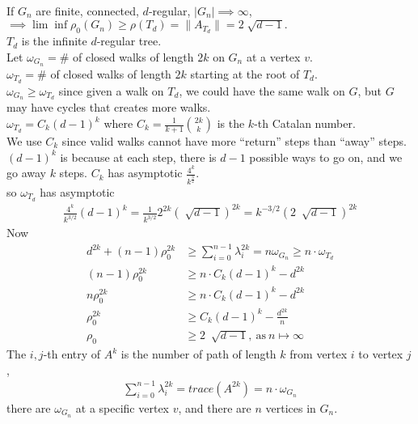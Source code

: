 \documentclass{article}
\begin{document}
\maketitle
\pagebreak

\begin{homeworkProblem}
    If $G_n$ are finite, connected, $d$-regular, $\lvert G_n \rvert \implies \infty$,
    $\implies \lim \inf \rho_0(G_n) \geq \rho (T_d) = \lVert A_{T_d} \rVert = 2 \sqrt[]{d-1}. $ \\
    $T_d$ is the infinite $d$-regular tree.\\
    Let $\omega_{G_n} = \#$ of closed walks of length $2k$ on $G_n$
    at a vertex $v$.\\
    $\omega_{T_d} = \#$ of closed walks of length $2k$ starting 
    at the root of $T_d$.\\
    $\omega_{G_n} \geq \omega_{T_d}$ since given a walk on $T_d$,
    we could have the same walk on $G$,
    but $G$ may have cycles that creates more walks.\\
    $\omega_{T_d} = C_k (d-1)^k$ where
    $C_k = \frac{ 1 }{ k+1 } {2k \choose k}$ is the $k$-th Catalan number.\\
    We use $C_k$ since valid walks cannot have more ``return''
    steps than ``away'' steps.
    $(d-1)^k$ is because at each step, there is $d-1$
    possible ways to go on, and we go away $k$ steps.
    $C_k$ has asymptotic $\frac{ 4^k }{ k^{\frac{ 3 }{ 2 }} }$.\\
    so $\omega_{T_d}$ has asymptotic 
    \begin{align}
        \frac{ 4^k }{ k^{3/2} } (d-1)^k = \frac{ 1 }{ k^{3/2} } 2^{2k} \left( \sqrt[]{d-1} \right)^{2k} = k^{-3/2} \left( 2 \ \sqrt[]{d-1} \right)^{2k} 
    \end{align}
    Now
    \begin{align}
        d^{2k} + (n-1) \rho_0^{2k} &\geq \sum_{i=0}^{n-1} \lambda_i^{2k} = n \omega_{G_n} \geq n \cdot \omega_{T_d}\\
        (n-1) \rho_0^{2k} &\geq n \cdot C_k (d-1)^k - d^{2k}\\
        n \rho_0^{2k} &\geq n \cdot C_k (d-1)^k - d^{2k}\\
    \rho_0^{2k} &\geq C_k (d-1)^k - \frac{d^{2k}}{n}\\
    \rho_0 &\geq 2 \ \sqrt[]{d-1}, \ \text{as} \ n \mapsto \infty
    \end{align}
    The $i,j$-th entry of $A^k$ is the number of path of length $k$
    from vertex $i$ to vertex $j$,
    \begin{align}
        \sum_{i=0}^{n-1} \lambda_i^{2k} = trace \left( A^{2k} \right) = n \cdot \omega_{G_n}
    \end{align}
    there are $\omega_{G_n}$ at a specific vertex $v$,
    and there are $n$ vertices in $G_n$.
    
    

\end{homeworkProblem}

\pagebreak
\end{document}
